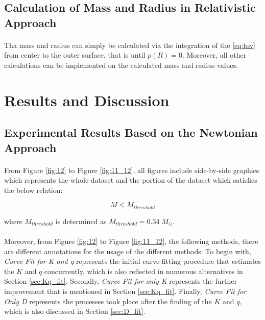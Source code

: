 \documentclass[letterpaper,12pt]{article}
\begin{document}
\subsection{Calculation of Mass and Radius in Relativistic Approach}
\paragraph{} Tha mass and radius can simply be calculated via the integration of the \eqref{eq:tov} from center to the outer surface, that is until $p(R) = 0$. Moreover, all other calculations can be implemented on the calculated mass and radius values.
\section{Results and Discussion}
\subsection{Experimental Results Based on the Newtonian Approach}

\label{sec:resdis}

\paragraph{} From Figure \ref{fig:12} to Figure \ref{fig:11_12}, all figures include side-by-side graphics which represents the whole dataset and the portion of the dataset which satisfies the below relation:

\begin{equation*}
    M \leq M_{threshold}
\end{equation*}

where $M_{threshold}$ is determined as $M_{threshold} = 0.34 \; M_\odot$.

\paragraph{} Moreover, from Figure \ref{fig:12} to Figure \ref{fig:11_12}, the following methods, there are different annotations for the usage of the different methods. To begin with, \textit{Curve Fit for K and q} represents the initial curve-fitting procedure that estimates the $K$ and $q$ concurrently, which is also reflected in numerous alternatives in Section \ref{sec:Kq_fit}. Secondly, \textit{Curve Fit for only K} represents the further improvement that is mentioned in Section \ref{sec:Kq_fit}. Finally, \textit{Curve Fit for Only D} represents the processes took place after the finding of the $K$ and $q$, which is also discussed in Section \ref{sec:D_fit}.
\end{document}
